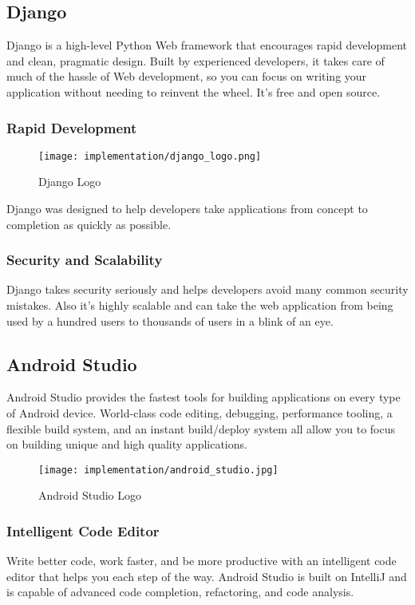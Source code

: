 \subsection{Django}
	Django is a high-level Python Web framework that encourages rapid development and clean, pragmatic design. Built by experienced developers, it takes care of much of the hassle of Web development, so you can focus on writing your application without needing to reinvent the wheel. It’s free and open source.
	\subsubsection{Rapid Development}
		\begin{wrapfigure}{r}{0.25\textwidth}
			\texttt{[image: implementation/django\_logo.png]}
			\caption{Django Logo}
		\end{wrapfigure}
		Django was designed to help developers take applications from concept to completion as quickly as possible.
	\subsubsection{Security and Scalability}
		Django takes security seriously and helps developers avoid many common security mistakes. Also it's highly scalable and can take the web application from being used by a hundred users to thousands of users in a blink of an eye.\cite{django}
		
\subsection{Android Studio}
	Android Studio provides the fastest tools for building applications on every type of Android device. World-class code editing, debugging, performance tooling, a flexible build system, and an instant build/deploy system all allow you to focus on building unique and high quality applications.\cite{android_studio}
	\begin{figure}[ht]
		\centering
		\texttt{[image: implementation/android\_studio.jpg]}
		\caption{Android Studio Logo}
	\end{figure}
	\subsubsection{Intelligent Code Editor}
		Write better code, work faster, and be more productive with an intelligent code editor that helps you each step of the way. Android Studio is built on IntelliJ and is capable of advanced code completion, refactoring, and code analysis.
